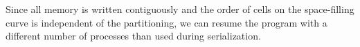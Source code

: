 



Since all memory is written contiguously and the order of cells on the space-filling curve is independent of the partitioning, we can resume the program with a different number of processes than used during serialization.

